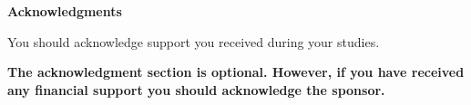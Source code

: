 \newpage
\vspace*{2.2 cm}
{\Large
\noindent
{\bf Acknowledgments}} \\
\vspace*{0.3 cm}

\noindent
You should acknowledge support you received during your studies. \\  

\vspace{5 cm}
\begin{center}
{\bf \Large The acknowledgment section is optional.  However, if you have received any financial support you should acknowledge the sponsor.}
\end{center}



